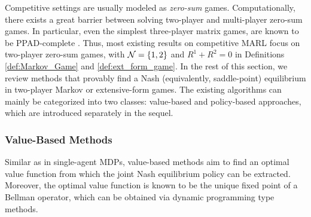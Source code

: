  
 \fi 
 
 
 
 Competitive settings are usually modeled as \emph{zero-sum} games. Computationally, 
  there exists a great barrier between solving  two-player and multi-player zero-sum games. 
 In particular, even the  simplest   three-player   matrix games, are known to be 
 PPAD-complete \cite{papadimitriou1992inefficient,daskalakis2009complexity}.
 Thus, most existing results on competitive MARL  focus on two-player zero-sum games, with $\mathcal{N} = \{1, 2\}$ and $R^1 + R^2 = 0$ in Definitions \ref{def:Markov_Game}  and \ref{def:ext_form_game}. 
 In the rest of this section, we review methods that provably find  a Nash (equivalently, saddle-point)  equilibrium in two-player Markov   or  extensive-form games.  
 The existing algorithms can mainly  be categorized into two classes: value-based  and policy-based approaches, 
 which are introduced separately in the sequel.
 
  
 \subsubsection{Value-Based Methods} \label{sec:value_comp}
 Similar as in single-agent MDPs, value-based methods aim to find an optimal value function  from which the joint  Nash equilibrium policy can be extracted.  
 Moreover, the optimal value function is known to be the unique fixed point of a Bellman operator, which can be obtained via dynamic programming type methods.
  
